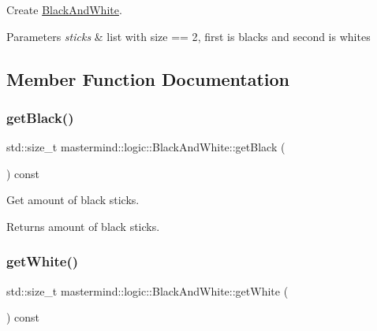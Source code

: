 Create \hyperlink{classmastermind_1_1logic_1_1_black_and_white}{Black\+And\+White}. 


\begin{DoxyParams}{Parameters}
{\em sticks} & list with {\ttfamily size == 2}, first is blacks and second is whites \\
\hline
\end{DoxyParams}


\subsection{Member Function Documentation}
\hypertarget{classmastermind_1_1logic_1_1_black_and_white_a5215b8ea947ec23c323448b46ba9e897}{}\label{classmastermind_1_1logic_1_1_black_and_white_a5215b8ea947ec23c323448b46ba9e897} 
\subsubsection{\texorpdfstring{get\+Black()}{getBlack()}}
{\footnotesize\ttfamily std\+::size\+\_\+t mastermind\+::logic\+::\+Black\+And\+White\+::get\+Black (\begin{DoxyParamCaption}{ }\end{DoxyParamCaption}) const}



Get amount of black sticks. 

\begin{DoxyReturn}{Returns}
amount of black sticks. 
\end{DoxyReturn}
\hypertarget{classmastermind_1_1logic_1_1_black_and_white_a85a1deac6d5cae64adce52aee8604fb0}{}\label{classmastermind_1_1logic_1_1_black_and_white_a85a1deac6d5cae64adce52aee8604fb0} 
\subsubsection{\texorpdfstring{get\+White()}{getWhite()}}
{\footnotesize\ttfamily std\+::size\+\_\+t mastermind\+::logic\+::\+Black\+And\+White\+::get\+White (\begin{DoxyParamCaption}{ }\end{DoxyParamCaption}) const}



